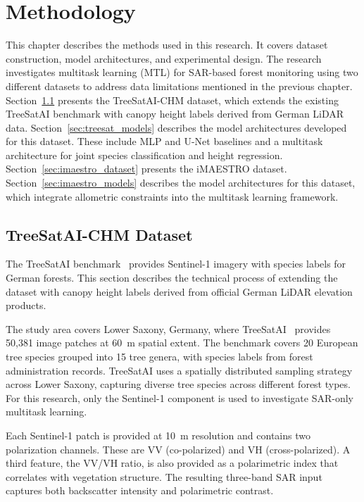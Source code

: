 \chapter{Methodology}
\label{chap:methodik}

This chapter describes the methods used in this research. It covers dataset construction, model architectures, and experimental design. The research investigates multitask learning (MTL) for SAR-based forest monitoring using two different datasets to address data limitations mentioned in the previous chapter. Section~\ref{sec:treesat_chm_dataset} presents the TreeSatAI-CHM dataset, which extends the existing TreeSatAI benchmark with canopy height labels derived from German LiDAR data. Section~\ref{sec:treesat_models} describes the model architectures developed for this dataset. These include MLP and U-Net baselines and a multitask architecture for joint species classification and height regression. Section~\ref{sec:imaestro_dataset} presents the iMAESTRO dataset. Section~\ref{sec:imaestro_models} describes the model architectures for this dataset, which integrate allometric constraints into the multitask learning framework.

\section{TreeSatAI-CHM Dataset}
\label{sec:treesat_chm_dataset}

The TreeSatAI benchmark~\cite{ahlswede_treesatai_2023} provides Sentinel-1 imagery with species labels for German forests. This section describes the technical process of extending the dataset with canopy height labels derived from official German LiDAR elevation products.

The study area covers Lower Saxony, Germany, where TreeSatAI~\cite{ahlswede_treesatai_2023} provides 50{,}381 image patches at \SI{60}{\meter} spatial extent. The benchmark covers 20 European tree species grouped into 15 tree genera, with species labels from forest administration records. TreeSatAI uses a spatially distributed sampling strategy across Lower Saxony, capturing diverse tree species across different forest types. For this research, only the Sentinel-1 component is used to investigate SAR-only multitask learning.

Each Sentinel-1 patch is provided at \SI{10}{\meter} resolution and contains two polarization channels. These are VV (co-polarized) and VH (cross-polarized). A third feature, the VV/VH ratio, is also provided as a polarimetric index that correlates with vegetation structure. The resulting three-band SAR input captures both backscatter intensity and polarimetric contrast.

